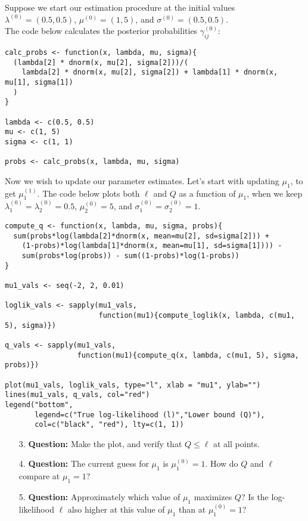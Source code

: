 \documentclass[12pt]{article}
\begin{document}
Suppose we start our estimation procedure at the initial values $\lambda^{(0)} = (0.5, 0.5)$, $\mu^{(0)} = (1, 5)$, and $\sigma^{(0)} = (0.5, 0.5)$.\\

The code below calculates the posterior probabilities $\gamma_{ij}^{(0)}$:

\begin{verbatim}
calc_probs <- function(x, lambda, mu, sigma){
  (lambda[2] * dnorm(x, mu[2], sigma[2]))/(
    lambda[2] * dnorm(x, mu[2], sigma[2]) + lambda[1] * dnorm(x, mu[1], sigma[1])
  )
}

lambda <- c(0.5, 0.5)
mu <- c(1, 5)
sigma <- c(1, 1)

probs <- calc_probs(x, lambda, mu, sigma)
\end{verbatim}

Now we wish to update our parameter estimates. Let's start with updating $\mu_1$, to get $\mu_1^{(1)}$. The code below plots both $\ell$ and $Q$ as a function of $\mu_1$, when we keep $\lambda_1^{(0)} = \lambda_2^{(0)} = 0.5$, $\mu_2^{(0)} = 5$, and $\sigma_1^{(0)} = \sigma_2^{(0)}= 1$.

\begin{verbatim}
compute_q <- function(x, lambda, mu, sigma, probs){
  sum(probs*log(lambda[2]*dnorm(x, mean=mu[2], sd=sigma[2])) + 
    (1-probs)*log(lambda[1]*dnorm(x, mean=mu[1], sd=sigma[1]))) - 
    sum(probs*log(probs)) - sum((1-probs)*log(1-probs))
}

mu1_vals <- seq(-2, 2, 0.01)

loglik_vals <- sapply(mu1_vals, 
                      function(mu1){compute_loglik(x, lambda, c(mu1, 5), sigma)})

q_vals <- sapply(mu1_vals, 
                 function(mu1){compute_q(x, lambda, c(mu1, 5), sigma, probs)})

plot(mu1_vals, loglik_vals, type="l", xlab = "mu1", ylab="")
lines(mu1_vals, q_vals, col="red")
legend("bottom",
       legend=c("True log-likelihood (l)","Lower bound (Q)"), 
       col=c("black", "red"), lty=c(1, 1))
\end{verbatim}

\begin{enumerate}
\item[3.] \textbf{Question:} Make the plot, and verify that $Q \leq \ell$ at all points.

\vspace{2.5cm}

\item[4.] \textbf{Question:} The current guess for $\mu_1$ is $\mu_1^{(0)} = 1$. How do $Q$ and $\ell$ compare at $\mu_1 = 1$?

\vspace{2.5cm}

\item[5.] \textbf{Question:} Approximately which value of $\mu_1$ maximizes $Q$? Is the log-likelihood $\ell$ also higher at this value of $\mu_1$ than at $\mu_1^{(0)} = 1$?

\end{enumerate}
\end{document}
